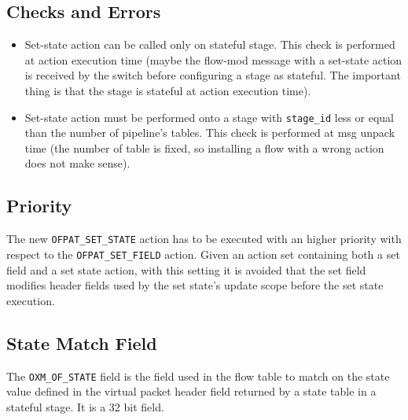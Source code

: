 \subsection{Checks and Errors}

\begin{itemize}
\item Set-state action can be called only on stateful stage. This check is performed at action execution time (maybe the flow-mod message with a set-state action is received by the switch before configuring a stage as stateful. The important thing is that the stage is stateful at action execution time).

\item Set-state action must be performed onto a stage with \texttt{stage\_id} less or equal than the number of pipeline’s tables. This check is performed at msg unpack time (the number of table is fixed, so installing a flow with a wrong action does not make sense).
\end{itemize}

\subsection{Priority}

The new \texttt{OFPAT\_SET\_STATE} action has to be executed with an higher priority with respect to the \texttt{OFPAT\_SET\_FIELD} action. Given an action set containing both a set field and a set state action, with this setting it is avoided that the set field modifies header fields used by the set state's update scope before the set state execution.


\subsection{State Match Field}
\label{sec:match_state}

The \texttt{OXM\_OF\_STATE} field is the field used in the flow table to match on the state value defined in the virtual packet header field returned by a state table in a stateful stage. It is a 32 bit field.


